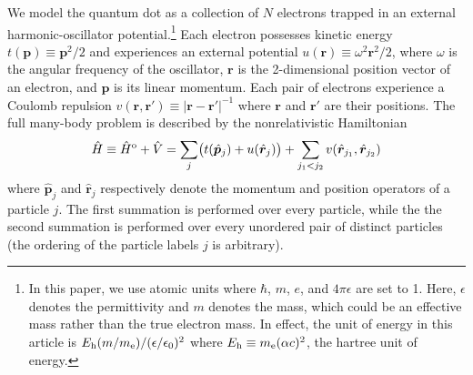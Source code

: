 We model the quantum dot as a collection of $N$ electrons trapped in an
external harmonic-oscillator potential.\footnote{In this paper, we use atomic
  units where $\hbar$, $m$, $e$, and $4 \pi \epsilon$ are set to 1.  Here,
  $\epsilon$ denotes the permittivity and $m$ denotes the mass, which could be
  an effective mass rather than the true electron mass.  In effect, the unit
  of energy in this article is
  $E_{\text h} (m / m_{\text e}) / (\epsilon / \epsilon_0)^2$ where
  $E_{\text h} \equiv m_{\text e} (\alpha c)^2$, the hartree unit of energy.}
Each electron possesses kinetic energy $t(\bm p) \equiv \bm p^2 / 2$ and
experiences an external potential $u(\bm r) \equiv \omega^2 \bm r^2 / 2$,
where $\omega$ is the angular frequency of the oscillator, $\bm r$ is the
2-dimensional position vector of an electron, and $\bm p$ is its linear
momentum.  Each pair of electrons experience a Coulomb repulsion
$v(\bm r, \bm r') \equiv |\bm r - \bm r'|^{-1}$ where $\bm r$ and $\bm r'$ are
their positions.  The full many-body problem is described by the
nonrelativistic Hamiltonian
\begin{align*}
  \hat H \equiv \hat H^{\text o} + \hat V = \sum_j \bigl(
    t(\hat{\bm p}_j) + u(\hat{\bm r}_j)
  \bigr) + \sum_{j_1 < j_2} v(\hat{\bm r}_{j_1}, \hat{\bm r}_{j_2})
\end{align*}
where $\hat{\bm p}_j$ and $\hat{\bm r}_j$ respectively denote the momentum and
position operators of a particle $j$.  The first summation is performed over
every particle, while the the second summation is performed over every
unordered pair of distinct particles (the ordering of the particle labels $j$ is arbitrary).

